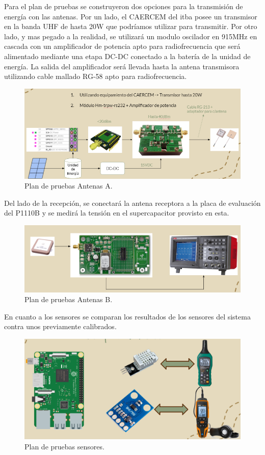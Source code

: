Para el plan de pruebas se construyeron dos opciones para la transmisión de energía con las antenas. Por un lado, el CAERCEM del itba posee un transmisor en la banda UHF de hasta 20W que podríamos utilizar para transmitir. Por otro lado, y mas pegado a la realidad, se utilizará un modulo oscilador en 915MHz en cascada con un amplificador de potencia apto para radiofrecuencia que será alimentado mediante una etapa DC-DC conectado a la batería de la unidad de energía. La salida del amplificador será llevada hasta la antena transmisora utilizando cable mallado RG-58 apto para radiofrecuencia.

\begin{figure}[H]
	\centering
	\includegraphics[width=0.8\linewidth]{ImagenesIngenieria de Detalle/planDePruebasAntenasA}	
	\caption{Plan de pruebas Antenas A.}
	\label{fig:planDePruebasAntenasA}
\end{figure}

Del lado de la recepción, se conectará la antena receptora a la placa de evaluación del P1110B y se medirá la tensión en el supercapacitor provisto en esta.


\begin{figure}[H]
	\centering
	\includegraphics[width=0.8\linewidth]{ImagenesIngenieria de Detalle/planDePruebasAntenasB}	
	\caption{Plan de pruebas Antenas B.}
	\label{fig:planDePruebasAntenasB}
\end{figure}

En cuanto a los sensores se comparan los resultados de los sensores del sistema contra unos previamente calibrados.

\begin{figure}[H]
	\centering
	\includegraphics[width=0.8\linewidth]{ImagenesIngenieria de Detalle/planDePruebasSensores}	
	\caption{Plan de pruebas sensores.}
	\label{fig:planDePruebasSensores}
\end{figure}